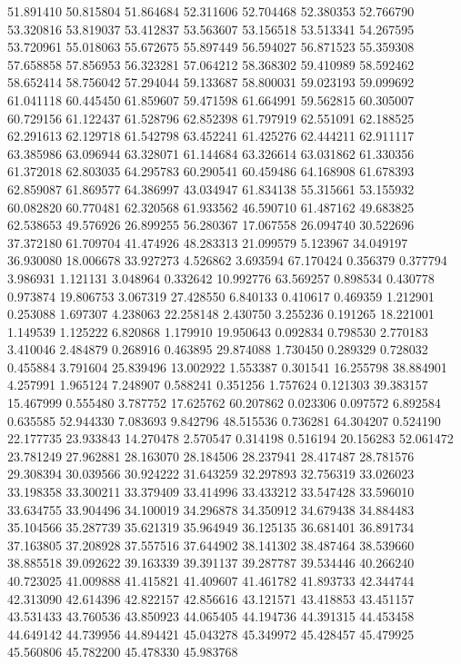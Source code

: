 51.891410
50.815804
51.864684
52.311606
52.704468
52.380353
52.766790
53.320816
53.819037
53.412837
53.563607
53.156518
53.513341
54.267595
53.720961
55.018063
55.672675
55.897449
56.594027
56.871523
55.359308
57.658858
57.856953
56.323281
57.064212
58.368302
59.410989
58.592462
58.652414
58.756042
57.294044
59.133687
58.800031
59.023193
59.099692
61.041118
60.445450
61.859607
59.471598
61.664991
59.562815
60.305007
60.729156
61.122437
61.528796
62.852398
61.797919
62.551091
62.188525
62.291613
62.129718
61.542798
63.452241
61.425276
62.444211
62.911117
63.385986
63.096944
63.328071
61.144684
63.326614
63.031862
61.330356
61.372018
62.803035
64.295783
60.290541
60.459486
64.168908
61.678393
62.859087
61.869577
64.386997
43.034947
61.834138
55.315661
53.155932
60.082820
60.770481
62.320568
61.933562
46.590710
61.487162
49.683825
62.538653
49.576926
26.899255
56.280367
17.067558
26.094740
30.522696
37.372180
61.709704
41.474926
48.283313
21.099579
5.123967
34.049197
36.930080
18.006678
33.927273
4.526862
3.693594
67.170424
0.356379
0.377794
3.986931
1.121131
3.048964
0.332642
10.992776
63.569257
0.898534
0.430778
0.973874
19.806753
3.067319
27.428550
6.840133
0.410617
0.469359
1.212901
0.253088
1.697307
4.238063
22.258148
2.430750
3.255236
0.191265
18.221001
1.149539
1.125222
6.820868
1.179910
19.950643
0.092834
0.798530
2.770183
3.410046
2.484879
0.268916
0.463895
29.874088
1.730450
0.289329
0.728032
0.455884
3.791604
25.839496
13.002922
1.553387
0.301541
16.255798
38.884901
4.257991
1.965124
7.248907
0.588241
0.351256
1.757624
0.121303
39.383157
15.467999
0.555480
3.787752
17.625762
60.207862
0.023306
0.097572
6.892584
0.635585
52.944330
7.083693
9.842796
48.515536
0.736281
64.304207
0.524190
22.177735
23.933843
14.270478
2.570547
0.314198
0.516194
20.156283
52.061472
23.781249
27.962881
28.163070
28.184506
28.237941
28.417487
28.781576
29.308394
30.039566
30.924222
31.643259
32.297893
32.756319
33.026023
33.198358
33.300211
33.379409
33.414996
33.433212
33.547428
33.596010
33.634755
33.904496
34.100019
34.296878
34.350912
34.679438
34.884483
35.104566
35.287739
35.621319
35.964949
36.125135
36.681401
36.891734
37.163805
37.208928
37.557516
37.644902
38.141302
38.487464
38.539660
38.885518
39.092622
39.163339
39.391137
39.287787
39.534446
40.266240
40.723025
41.009888
41.415821
41.409607
41.461782
41.893733
42.344744
42.313090
42.614396
42.822157
42.856616
43.121571
43.418853
43.451157
43.531433
43.760536
43.850923
44.065405
44.194736
44.391315
44.453458
44.649142
44.739956
44.894421
45.043278
45.349972
45.428457
45.479925
45.560806
45.782200
45.478330
45.983768
